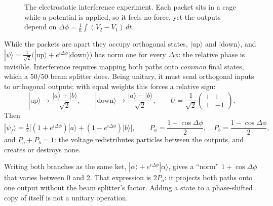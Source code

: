 \begin{figure}[ht]
\centering
{}
\caption{The electrostatic interference experiment. Each packet sits in a cage while a potential is applied, so it feels no force, yet the outputs depend on $\Delta\phi = \frac1\hbar\int(V_2-V_1)\,dt$.}
\label{fig:cages}
\end{figure}

While the packets are apart they occupy orthogonal states, $|\text{up}\rangle$ and $|\text{down}\rangle$, and $|\psi\rangle = \frac{1}{\sqrt2}\bigl(|\text{up}\rangle + e^{i\Delta\phi}|\text{down}\rangle\bigr)$ has norm one for every $\Delta\phi$: the relative phase is invisible. Interference requires mapping both paths onto \emph{common} final states, which a 50/50 beam splitter does. Being unitary, it must send orthogonal inputs to orthogonal outputs; with equal weights this forces a relative sign:
\[
    |\text{up}\rangle\to\frac{|a\rangle+|b\rangle}{\sqrt2},
    \qquad
    |\text{down}\rangle\to\frac{|a\rangle-|b\rangle}{\sqrt2},
    \qquad
    U = \frac{1}{\sqrt2}\begin{pmatrix}1&1\\1&-1\end{pmatrix}.
\]
Then
\[
    |\psi_f\rangle = \tfrac12\bigl[(1+e^{i\Delta\phi})|a\rangle + (1-e^{i\Delta\phi})|b\rangle\bigr],
    \qquad
    P_a = \frac{1+\cos\Delta\phi}{2},
    \quad
    P_b = \frac{1-\cos\Delta\phi}{2},
\]
and $P_a+P_b = 1$: the voltage redistributes particles between the outputs, and creates or destroys none.

\begin{fact}
Writing both branches as the same ket, $|\alpha\rangle + e^{i\Delta\phi}|\alpha\rangle$, gives a ``norm'' $1+\cos\Delta\phi$ that varies between 0 and 2. That expression is $2P_a$: it projects both paths onto one output without the beam splitter's factor. Adding a state to a phase-shifted copy of itself is not a unitary operation.
\end{fact}


